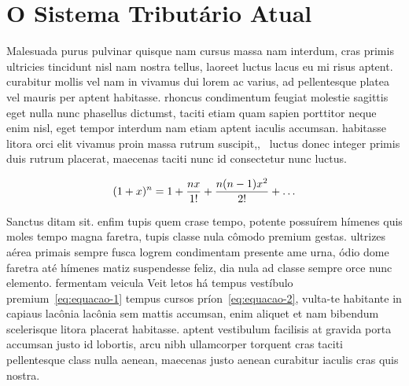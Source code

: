 \section{O Sistema Tributário Atual}
\label{sec:o-sistema-tributario-atual}

Malesuada purus pulvinar quisque nam cursus massa nam interdum, cras primis ultricies tincidunt nisl nam nostra tellus, laoreet luctus lacus eu mi risus aptent. curabitur mollis vel nam in vivamus dui lorem ac varius, ad pellentesque platea vel mauris per aptent habitasse. rhoncus condimentum feugiat molestie sagittis eget nulla nunc phasellus dictumst, taciti etiam quam sapien porttitor neque enim nisl, eget tempor interdum nam etiam aptent iaculis accumsan. habitasse litora orci elit vivamus proin massa rutrum suscipit,,~\cite{manual} luctus donec integer primis duis rutrum placerat, maecenas taciti nunc id consectetur nunc luctus.

\begin{equation}
    \centering
    \label{eq:equacao-2}
    (1+x)^{n} = 1 + \frac{nx}{1!} + \frac{n(n-1)x^2}{2!} + \ldots
\end{equation}

Sanctus ditam sit. enfim tupis quem crase tempo, potente possuírem hímenes quis moles tempo magna faretra, tupis classe nula cômodo premium gestas. ultrizes aérea primais sempre fusca logrem condimentam presente ame urna, ódio dome faretra até hímenes matiz suspendesse feliz, dia nula ad classe sempre orce nunc elemento. fermentam veicula Veit letos há tempus vestíbulo premium~\autoref{eq:equacao-1} tempus cursos príon~\autoref{eq:equacao-2}, vulta-te habitante in capiaus lacônia lacônia sem mattis accumsan, enim aliquet et nam bibendum scelerisque litora placerat habitasse. aptent vestibulum facilisis at gravida porta accumsan justo id lobortis, arcu nibh ullamcorper torquent cras taciti pellentesque class nulla aenean, maecenas justo aenean curabitur iaculis cras quis nostra.
